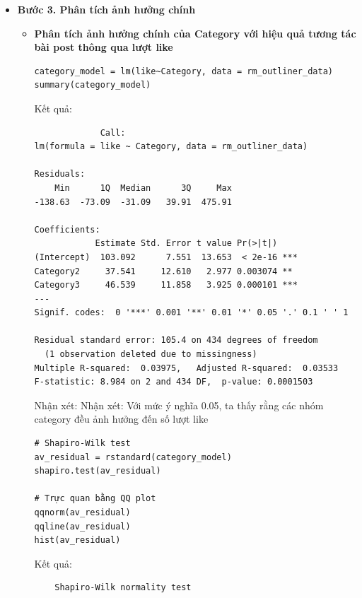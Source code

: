 \begin{itemize}
   \item \textbf{Bước 3. Phân tích ảnh hưởng chính}
   \begin{itemize}
       \item \textbf{Phân tích ảnh hưởng chính của Category với hiệu quả tương tác bài post thông qua lượt like}
       \begin{lstlisting}
category_model = lm(like~Category, data = rm_outliner_data)
summary(category_model)
       \end{lstlisting}
       Kết quả:
       \begin{lstlisting}
             Call:
lm(formula = like ~ Category, data = rm_outliner_data)

Residuals:
    Min      1Q  Median      3Q     Max 
-138.63  -73.09  -31.09   39.91  475.91 

Coefficients:
            Estimate Std. Error t value Pr(>|t|)    
(Intercept)  103.092      7.551  13.653  < 2e-16 ***
Category2     37.541     12.610   2.977 0.003074 ** 
Category3     46.539     11.858   3.925 0.000101 ***
---
Signif. codes:  0 '***' 0.001 '**' 0.01 '*' 0.05 '.' 0.1 ' ' 1

Residual standard error: 105.4 on 434 degrees of freedom
  (1 observation deleted due to missingness)
Multiple R-squared:  0.03975,	Adjusted R-squared:  0.03533 
F-statistic: 8.984 on 2 and 434 DF,  p-value: 0.0001503            
       \end{lstlisting}
    Nhận xét: Nhận xét: Với mức ý nghĩa 0.05, ta thấy rằng các nhóm category đều ảnh hưởng đến số lượt like
    \begin{lstlisting}
# Shapiro-Wilk test
av_residual = rstandard(category_model)
shapiro.test(av_residual)

# Trực quan bằng QQ plot
qqnorm(av_residual)
qqline(av_residual)
hist(av_residual)
    \end{lstlisting}
    Kết quả:
    \begin{lstlisting}
	Shapiro-Wilk normality test


\end{lstlisting}
\end{itemize}
\end{itemize}
